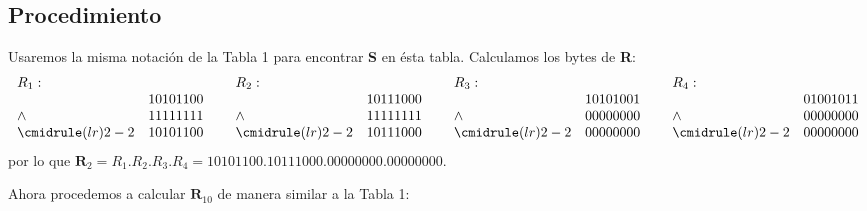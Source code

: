\documentclass[stu, 12pt, letterpaper, donotrepeattitle, floatsintext, natbib]{apa7}
\begin{document}
\subsection*{Procedimiento}
Usaremos la misma notación de la Tabla 1 para encontrar \textbf{S} en ésta tabla. Calculamos los bytes de \textbf{R}:
\[
    \begin{matrix}
        \begin{array}{lr}
           R_1:   & \\
               & 10101100  \\ %
            \land  & 11111111 \\ %
            \cmidrule(lr){2-2}
              & 10101100  \\ %
            \end{array}\,\,
        & 
        \begin{array}{lr}
            R_2:   & \\
               & 10111000  \\
            \land  & 11111111 \\
            \cmidrule(lr){2-2}
              & 10111000  \\
            \end{array}\,\,
        & 
        \begin{array}{lr}
            R_3:   & \\
               & 10101001  \\
            \land  & 00000000 \\
            \cmidrule(lr){2-2}
              & 00000000  \\
            \end{array}\,\,
        & 
        \begin{array}{lr}
            R_4:   & \\
               & 01001011  \\
            \land  & 00000000 \\
            \cmidrule(lr){2-2}
              & 00000000  \\
            \end{array}
        \end{matrix}
\]
por lo que $\textbf{R}_2=R_1$.$R_2$.$R_3.R_4=10101100$.$10111000$.$00000000$.$00000000$.\par
\vspace{\baselineskip}
Ahora procedemos a calcular $\textbf{R}_{10}$ de manera similar a la Tabla 1:
\end{document}
